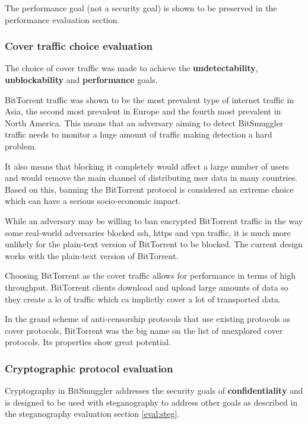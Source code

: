 \documentclass[11pt]{book} %
\newcommand{\projectName}{BitSmuggler }
\begin{document}
The performance goal (not a security goal) is shown to be preserved in the performance evaluation section.

\subsubsection {Cover traffic choice evaluation}

The choice of cover traffic was made to achieve the \textbf{undetectability}, \textbf{unblockability} and \textbf{performance} goals.

BitTorrent traffic was shown to be the most prevalent type of internet traffic in Asia, the second most prevalent in Europe and the fourth most prevalent in North America. This means that an adversary aiming to detect \projectName traffic needs to monitor a huge amount of traffic making detection a hard problem.

It also means that blocking it completely would affect a large number of users and would remove the main channel of distributing user data in many countries. Based on this, banning the BitTorrent protocol is considered an extreme choice which can have a serious socio-economic impact.

While an adversary may be willing to ban encrypted BitTorrent traffic in the way some real-world adversaries blocked ssh, https and vpn traffic, it is much more unlikely for the plain-text version of BitTorrent to be blocked. The current design works with the plain-text version of BitTorrent.

Choosing BitTorrent as the cover traffic allows for performance in terms of high throughput.  BitTorrent clients download and upload large amounts of data so they create a lo of traffic which ca implictly cover a lot of transported data.

In the grand scheme of anti-censorship protocols that use existing protocols as cover protocols, BitTorrent was the big name on the list of unexplored cover protocols. Its properties show great potential.

\subsubsection {Cryptographic protocol evaluation}

Cryptography in \projectName addresses the security goals of \textbf{confidentiality} and is designed to be used with steganography to address other goals as described in the steganography evaluation section \ref{eval:steg}.
\end{document}
